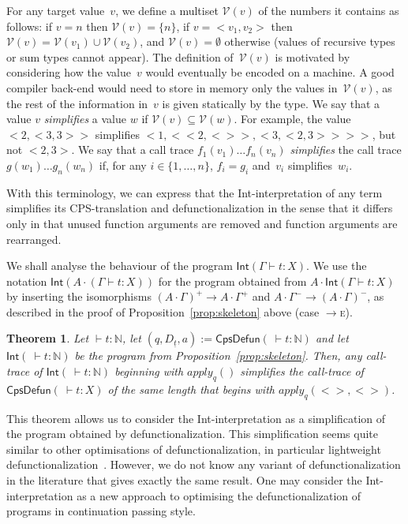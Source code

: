 \documentclass{LMCS}
\theoremstyle{definition}
\theoremstyle{plain}
\newtheorem{theorem}[thm]{Theorem}
\newcommand{\kw}[1]{\mathsf{#1}}
\newcommand{\NN}{\mathbb{N}}
\newcommand{\Capply}{\textit{apply}}
\newcommand{\R}[1]{\textsc{#1}}
\newcommand{\SeqTm}[3]{#1 \vdash #2 \colon #3}
\newcommand{\cps}[1]{\underline{#1}}
\newcommand{\semc}[1]{\kw{Int}(#1)}
\begin{document}
For any target value~$v$, we define a multiset $\mathcal{V}(v)$ of the 
numbers it contains as follows: 
if $v=n$ then $\mathcal{V}(v) = \{n\}$,
if $v=<v_1,v_2>$ then
$\mathcal{V}(v) = \mathcal{V}(v_1) \cup \mathcal{V}(v_2)$,
and $\mathcal{V}(v) = \emptyset$ otherwise (values of
recursive types or sum types cannot appear).
The definition of~$\mathcal{V}(v)$ is motivated by considering how the
value~$v$ would eventually be encoded on a machine. A good compiler back-end
would need to store in memory only the values in~$\mathcal{V}(v)$, as the
rest of the information in~$v$ is given statically by the type.
We say that a value $v$ \emph{simplifies} a value $w$ if
$\mathcal{V}(v) \subseteq \mathcal{V}(w)$.
For example, the value $<2,<3,3>>$ simplifies $<1,<<2,<>>,<3,<2,3>>>>$,
but not $<2,3>$.
We say that a call trace $f_1(v_1)\dots f_n(v_n)$ \emph{simplifies} the
call trace $g(w_1)\dots g_n(w_n)$ if, for any $i\in\{1,\dots,n\}$,
$f_i=g_i$ and~$v_i$ simplifies~$w_i$.

With this terminology, we can 
express that the Int-interpretation of any term simplifies
its CPS-translation and defunctionalization in the sense that 
it differs only in that unused function arguments are removed and
function arguments are rearranged.

We shall analyse the behaviour of the program $\semc{\SeqTm{\Gamma}{t}{X}}$.
We use the notation $\semc{A\cdot(\SeqTm{\Gamma}{t}{X})}$
for the program obtained from $A\cdot \semc{\SeqTm{\Gamma}{t}{X}}$ 
by inserting the isomorphisms $(A\cdot \Gamma)^+ \to A \cdot
\Gamma^+$ and $A\cdot \Gamma^- \to (A\cdot \Gamma)^-$, as described
in the proof of Proposition~\ref{prop:skeleton} above
(case \R{$\to$e}).

\begin{theorem}
  \label{prop:trace}
  Let\/ $\SeqTm{}{t}{\NN}$, 
  let $(q, D_{\cps t}, a) := \kw{CpsDefun}(\SeqTm{\ }{t}{\NN})$
  and let\/ $\semc{\SeqTm{\ }{t}{\NN}}$ be the program from
  Proposition~\ref{prop:skeleton}.
  Then, any call-trace of\/ $\semc{\SeqTm{\ }{t}{\NN}}$ beginning with $\Capply_q()$ 
  simplifies the call-trace of\/~$\kw{CpsDefun}(\SeqTm{\ }{t}{X})$ of the same length
  that begins with $\Capply_q(<>, <>)$.
\end{theorem}
This theorem allows us to consider the Int-interpretation as a
simplification of the program obtained by defunctionalization.
This simplification seems quite similar to other optimisations of
defunctionalization, in particular lightweight
defunctionalization~\cite{banerjee}. However, we do not know 
any variant of defunctionalization in the
literature that gives exactly the same result.
One may consider the Int-interpretation
as a new approach to optimising the defunctionalization of
programs in continuation passing style.
\end{document}
